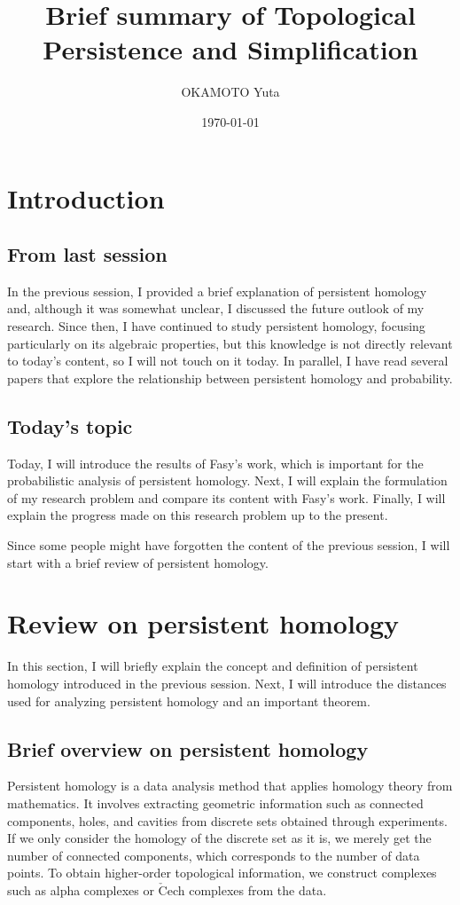 \documentclass[dvipdfmx,11pt,notheorems]{article}
\title{Brief summary of Topological Persistence and Simplification}
\author{OKAMOTO Yuta}
\date{\today}
\begin{document}
\tableofcontents

\section{Introduction}

\subsection{From last session}

In the previous session, I provided a brief explanation of persistent homology and, although it was somewhat unclear, I discussed the future outlook of my research. Since then, I have continued to study persistent homology, focusing particularly on its algebraic properties, but this knowledge is not directly relevant to today's content, so I will not touch on it today. In parallel, I have read several papers that explore the relationship between persistent homology and probability.

\subsection{Today's topic}

Today, I will introduce the results of Fasy's work\cite{confidence-sets-for-persistence-diagrams}, which is important for the probabilistic analysis of persistent homology. Next, I will explain the formulation of my research problem and compare its content with Fasy's work. Finally, I will explain the progress made on this research problem up to the present.

Since some people might have forgotten the content of the previous session, I will start with a brief review of persistent homology.

\section{Review on persistent homology}

In this section, I will briefly explain the concept and definition of persistent homology introduced in the previous session. Next, I will introduce the distances used for analyzing persistent homology and an important theorem.

\subsection{Brief overview on persistent homology}
Persistent homology is a data analysis method that applies homology theory from mathematics. It involves extracting geometric information such as connected components, holes, and cavities from discrete sets obtained through experiments. If we only consider the homology of the discrete set as it is, we merely get the number of connected components, which corresponds to the number of data points. To obtain higher-order topological information, we construct complexes such as alpha complexes or $\check{\mathrm{C}}$ech complexes from the data.
\end{document}

